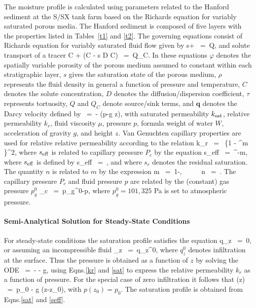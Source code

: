 \documentclass[12pt]{article}
\def\EQ#1\EN{\begin{equation}#1\end{equation}}
\newcommand{\eq}{\ =\ }
\newcommand{\p}{{\partial}}
\newcommand{\bnabla}{\boldsymbol{\nabla}}
\newcommand{\bq}{\boldsymbol{q}}
\begin{document}
The moisture profile is calculated using parameters related to the Hanford sediment at the S/SX tank farm based on the Richards equation for variably saturated porous media. The Hanford sediment is composed of five layers with the properties listed in Tables~\ref{t1} and \ref{t2}. The governing equations consist of Richards equation for variably saturated fluid flow given by
\EQ
\frac{\p}{\p t} \varphi s\rho + \bnabla\cdot\bq\rho \eq Q,
\EN
and solute transport of a tracer
\EQ
\frac{\p}{\p t}\varphi C + \bnabla\cdot\big(\bq C - \varphi s \tau D \bnabla C\big) \eq Q_C.
\EN
In these equations $\varphi$ denotes the spatially variable porosity of the porous medium assumed to constant within each stratigraphic layer, $s$ gives the saturation state of the porous medium, $\rho$ represents the fluid density in general a function of pressure and temperature, $C$ denotes the solute concentration, $D$ denotes the diffusion/dispersion coefficient, $\tau$ represents tortuosity, $Q$ and $Q_C$ denote source/sink terms, and $\bq$ denotes the Darcy velocity defined by
\EQ
\bq\eq -  \bnabla (p-\rho g z),
\EN
with saturated permeability $k_{\rm sat}$, relative permeability $k_r$, fluid viscosity $\mu$, pressure $p$, formula weight of water $W$, acceleration of gravity $g$, and height $z$. Van Genuchten capillary properties are used for relative relative permeability according to the relation
\EQ\label{kr}
k_{r} \eq {} \left\{1 - ^m \right\}^2, 
\EN
where $s_{\rm eff}$ is related to capillary pressure $P_c$ by the equation
\EQ\label{sat}
s_{\rm eff} \eq {}^{-m}, 
\EN 
where $s_{\rm 
eff}$ is defined by 
\EQ\label{seff1}
s_{\rm eff} \eq {}, 
\EN 
and where $s_r$ denotes the residual saturation. The quantity $n$ is related to $m$ by the expression 
\EQ\label{lambda} 
m \eq 1-, \ \ \ \ \ n \eq {}. 
\EN 
The capillary pressure $P_c$ and fluid pressure $p$ are related by the (constant) gas pressure $p_g^0$
\EQ
P_c \eq p_g^0-p,
\EN
where $p_g^0 \!=\! 101,325$ Pa is set to atmospheric pressure.

\paragraph{Semi-Analytical Solution for Steady-State Conditions}

For steady-state conditions the saturation profile satisfies the equation
\EQ
\frac{d}{dz} \rho q_z \eq 0,
\EN
or assuming an incompressible fluid
\EQ
q_z \eq q_z^0,
\EN
where $q_z^0$ denotes infiltration at the surface. Thus the pressure is obtained as a function of $z$ by solving the ODE
\EQ\label{dpdz}
 \eq - - \rho g,
\EN
using Eqns.\eqref{kr} and \eqref{sat} to express the relative permeability $k_r$ as a function of pressure. For the special case of zero infiltration it follows that
\EQ
p(z) \eq p_0 - \rho g (z-z_0),
\EN
with $p(z_0)\!=\!p_0$. The saturation profile is obtained from Eqns.\eqref{sat} and \eqref{seff}.
\end{document}
